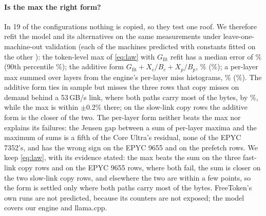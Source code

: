 \paragraph{Is the max the right form?} In 19 of the \lawCfg{} configurations nothing is copied, so they test one
roof. We therefore refit the model and its alternatives on the same \lawRows{} measurements under leave-one-machine-out
validation (each of the \lawHostsLoho{} machines predicted with constants fitted on the other \lawHostsLohoOther): the token-level max of
\cref{eq:law} with $G_{\mathrm{fit}}$ refit has a median error of \lohoMaxMed\% (90th percentile \lohoMaxPninety\%); the additive form
$G_{\mathrm{fit}}+X_c/B_c+X_p/B_p$, \lohoAddMed\% (\lohoAddPninety\%); a per-layer max summed over layers from the engine's per-layer
miss histograms, \lohoLayerMed\% (\lohoLayerPninety\%). The additive form ties in sample but misses the three
rows that copy misses on demand behind a 53\,GB/s link, where both paths carry most of the bytes, by
\lohoAddFastFetchMin\%, while the max is within $\pm$0.2\% there; on the slow-link copy rows the additive form is the
closer of the two. The per-layer form neither beats the max nor explains its failures: the Jensen gap between a sum
of per-layer maxima and the maximum of sums is a fifth of the Core Ultra's residual, none of the EPYC 7352's, and has
the wrong sign on the EPYC 9655 and on the prefetch rows. We keep \cref{eq:law}, with its evidence stated: the max beats the sum on the three fast-link copy rows and on the
EPYC 9655 rows, where both fail, the sum is closer on the two slow-link copy rows, and elsewhere the two are within a
few points, so the form is settled only where both paths carry most of the bytes. FreeToken's own runs are not
predicted, because its counters are not exposed; the model covers our engine and llama.cpp.

